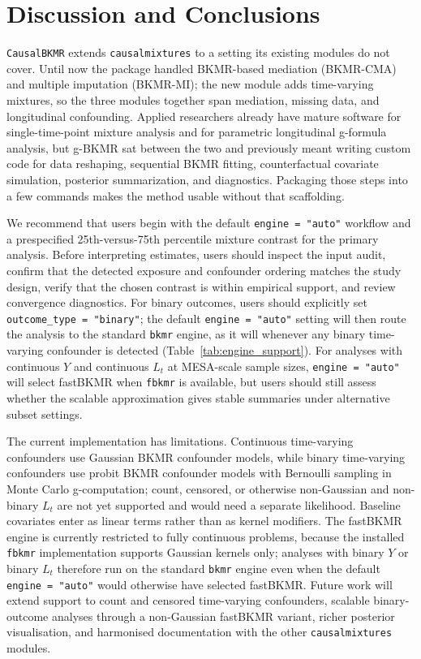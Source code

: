 \documentclass[11pt]{article}
\newcommand{\pkg}[1]{\texttt{#1}}
\newcommand{\code}[1]{\texttt{#1}}
\begin{document}
\section*{Discussion and Conclusions}
\label{sec:discussion}

\pkg{CausalBKMR} extends \pkg{causalmixtures} to a setting its existing modules do not cover. Until now the package handled BKMR-based mediation (BKMR-CMA) and multiple imputation (BKMR-MI); the new module adds time-varying mixtures, so the three modules together span mediation, missing data, and longitudinal confounding. Applied researchers already have mature software for single-time-point mixture analysis and for parametric longitudinal g-formula analysis, but g-BKMR sat between the two and previously meant writing custom code for data reshaping, sequential BKMR fitting, counterfactual covariate simulation, posterior summarization, and diagnostics. Packaging those steps into a few commands makes the method usable without that scaffolding.

We recommend that users begin with the default \code{engine = "auto"} workflow and a prespecified 25th-versus-75th percentile mixture contrast for the primary analysis. Before interpreting estimates, users should inspect the input audit, confirm that the detected exposure and confounder ordering matches the study design, verify that the chosen contrast is within empirical support, and review convergence diagnostics. For binary outcomes, users should explicitly set \code{outcome\_type = "binary"}; the default \code{engine = "auto"} setting will then route the analysis to the standard \pkg{bkmr} engine, as it will whenever any binary time-varying confounder is detected (Table~\ref{tab:engine_support}). For analyses with continuous $Y$ and continuous $L_t$ at MESA-scale sample sizes, \code{engine = "auto"} will select fastBKMR when \pkg{fbkmr} is available, but users should still assess whether the scalable approximation gives stable summaries under alternative subset settings.

The current implementation has limitations. Continuous time-varying confounders use Gaussian BKMR confounder models, while binary time-varying confounders use probit BKMR confounder models with Bernoulli sampling in Monte Carlo g-computation; count, censored, or otherwise non-Gaussian and non-binary $L_t$ are not yet supported and would need a separate likelihood. Baseline covariates enter as linear terms rather than as kernel modifiers. The fastBKMR engine is currently restricted to fully continuous problems, because the installed \pkg{fbkmr} implementation supports Gaussian kernels only; analyses with binary $Y$ or binary $L_t$ therefore run on the standard \pkg{bkmr} engine even when the default \code{engine = "auto"} would otherwise have selected fastBKMR. Future work will extend support to count and censored time-varying confounders, scalable binary-outcome analyses through a non-Gaussian fastBKMR variant, richer posterior visualisation, and harmonised documentation with the other \pkg{causalmixtures} modules.
\end{document}
